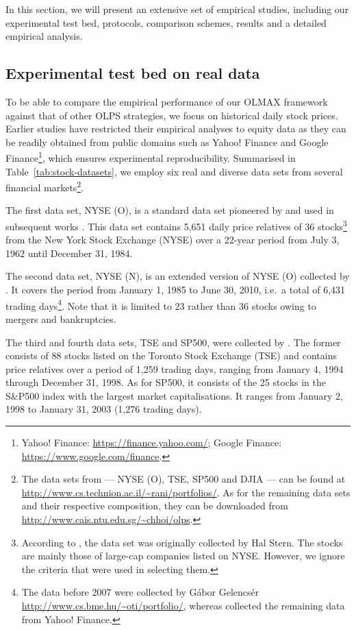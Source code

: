 In this section, we will present an extensive set of empirical studies, including our experimental test bed, protocols, comparison schemes, results and a detailed empirical analysis.

\subsection{Experimental test bed on real data}

To be able to compare the empirical performance of our OLMAX framework against that of other OLPS strategies, we focus on historical daily stock prices. Earlier studies have restricted their empirical analyses to equity data as they can be readily obtained from public domains such as Yahoo! Finance and Google Finance\footnote{Yahoo! Finance: \url{https://finance.yahoo.com/}; Google Finance: \url{https://www.google.com/finance}.}, which ensures experimental reproducibility. Summarised in Table~\ref{tab:stock-datasets}, we employ six real and diverse data sets from several financial markets\footnote{The data sets from \citep{borodin04} --- NYSE (O), TSE, SP500 and DJIA --- can be found at \url{http://www.cs.technion.ac.il/~rani/portfolios/}. As for the remaining data sets and their respective composition, they can be downloaded from \url{http://www.cais.ntu.edu.sg/~chhoi/olps}.}.

The first data set, NYSE (O), is a standard data set pioneered by \citet{cover} and used in subsequent works \citep{eg, borodin04, ons, bnn}. This data set contains 5,651 daily price relatives of 36 stocks\footnote{According to \citet{eg}, the data set was originally collected by Hal Stern. The stocks are mainly those of large-cap companies listed on NYSE. However, we ignore the criteria that were used in selecting them.} from the New York Stock Exchange (NYSE) over a 22-year period from July 3, 1962 until December 31, 1984.

The second data set, NYSE (N), is an extended version of NYSE (O) collected by \citet{cwmr}. It covers the period from January 1, 1985 to June 30, 2010, i.e.\ a total of 6,431 trading days\footnote{The data before 2007 were collected by G\'{a}bor Gelencs\'{e}r \url{http://www.cs.bme.hu/~oti/portfolio/}, whereas \citet{cwmr} collected the remaining data from Yahoo! Finance.}. Note that it is limited to 23 rather than 36 stocks owing to mergers and bankruptcies.

The third and fourth data sets, TSE and SP500, were collected by \citet{borodin04}. The former consists of 88 stocks listed on the Toronto Stock Exchange (TSE) and contains price relatives over a period of 1,259 trading days, ranging from January 4, 1994 through December 31, 1998. As for SP500, it consists of the 25 stocks in the S\&P500 index with the largest market capitalisations. It ranges from January 2, 1998 to January 31, 2003 (1,276 trading days).

